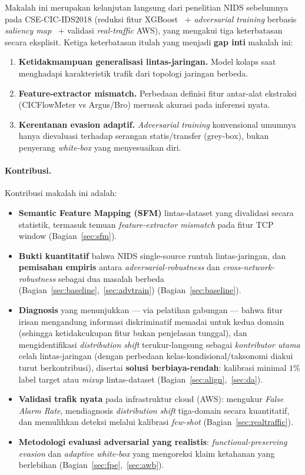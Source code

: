 \documentclass[11pt,a4paper]{article}
\begin{document}
Makalah ini merupakan kelanjutan langsung dari penelitian NIDS sebelumnya pada
CSE-CIC-IDS2018 (reduksi fitur XGBoost~\cite{xgboost} + \emph{adversarial
training} berbasis \emph{saliency map}~\cite{saliency} + validasi
\emph{real-traffic} AWS), yang
mengakui tiga keterbatasan secara eksplisit. Ketiga keterbatasan itulah yang menjadi
\textbf{gap inti} makalah ini:
\begin{enumerate}
  \item \textbf{Ketidakmampuan generalisasi lintas-jaringan.} Model kolaps saat
  menghadapi karakteristik trafik dari topologi jaringan berbeda.
  \item \textbf{Feature-extractor mismatch.} Perbedaan definisi fitur antar-alat
  ekstraksi (CICFlowMeter vs Argus/Bro) merusak akurasi pada inferensi nyata.
\ifadversarial
  \item \textbf{Kerentanan evasion adaptif.} \emph{Adversarial training}
  konvensional umumnya hanya dievaluasi terhadap serangan statis/transfer
  (grey-box), bukan penyerang \emph{white-box} yang menyesuaikan diri.
\fi
\end{enumerate}

\paragraph{Kontribusi.} Kontribusi makalah ini adalah:
\begin{itemize}
  \item \textbf{Semantic Feature Mapping (SFM)} lintas-dataset yang divalidasi
  secara statistik, termasuk temuan \emph{feature-extractor mismatch} pada fitur
  TCP window (Bagian~\ref{sec:sfm}).
  \item \textbf{Bukti kuantitatif} bahwa NIDS single-source runtuh
  lintas-jaringan\ifadversarial, dan \textbf{pemisahan empiris} antara
  \emph{adversarial-robustness} dan \emph{cross-network-robustness} sebagai dua
  masalah berbeda (Bagian~\ref{sec:baseline},~\ref{sec:advtrain})\else{} (Bagian~\ref{sec:baseline})\fi.
  \item \textbf{Diagnosis} yang menunjukkan --- via pelatihan gabungan --- bahwa fitur
  irisan mengandung informasi diskriminatif memadai untuk kedua domain (sehingga
  ketidakcukupan fitur bukan penjelasan tunggal), dan mengidentifikasi
  \emph{distribution shift} terukur-langsung sebagai \emph{kontributor utama} celah
  lintas-jaringan (dengan perbedaan kelas-kondisional/taksonomi diakui turut
  berkontribusi), disertai \textbf{solusi berbiaya-rendah}:
  kalibrasi minimal $1\%$ label target atau \emph{mixup} lintas-dataset
  (Bagian~\ref{sec:align},~\ref{sec:da}).
  \item \textbf{Validasi trafik nyata} pada infrastruktur cloud (AWS): mengukur
  \emph{False Alarm Rate}, mendiagnosis \emph{distribution shift} tiga-domain
  secara kuantitatif, dan memulihkan deteksi melalui kalibrasi \emph{few-shot}
  (Bagian~\ref{sec:realtraffic}).
\ifadversarial
  \item \textbf{Metodologi evaluasi adversarial yang realistis}:
  \emph{functional-preserving evasion} dan \emph{adaptive white-box} yang
  mengoreksi klaim ketahanan yang berlebihan (Bagian~\ref{sec:fpe},~\ref{sec:awb}).
\fi
\end{itemize}
\end{document}
